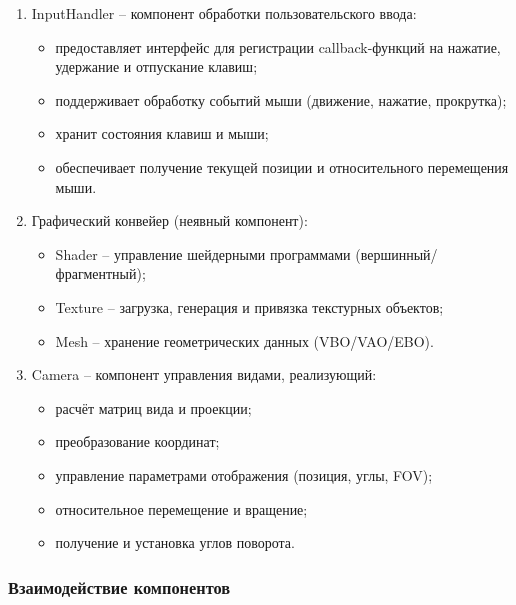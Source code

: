 \begin{enumerate}
    \item InputHandler -- компонент обработки пользовательского ввода:

    \begin{itemize}[itemindent=\parindent,leftmargin=\parindent]
        \item предоставляет интерфейс для регистрации callback-функций на нажатие, удержание и отпускание клавиш;
        \item поддерживает обработку событий мыши (движение, нажатие, прокрутка);
        \item хранит состояния клавиш и мыши;
        \item обеспечивает получение текущей позиции и относительного перемещения мыши.
    \end{itemize}

    \item Графический конвейер (неявный компонент):

    \begin{itemize}[itemindent=\parindent,leftmargin=\parindent]
        \item Shader -- управление шейдерными программами (вершинный/фрагментный);
        \item Texture -- загрузка, генерация и привязка текстурных объектов;
        \item Mesh -- хранение геометрических данных (VBO/VAO/EBO).
    \end{itemize}

    \item Camera -- компонент управления видами, реализующий:

    \begin{itemize}[itemindent=\parindent,leftmargin=\parindent]
        \item расчёт матриц вида и проекции;
        \item преобразование координат;
        \item управление параметрами отображения (позиция, углы, FOV);
        \item относительное перемещение и вращение;
        \item получение и установка углов поворота.
    \end{itemize}
\end{enumerate}

\subsubsection{Взаимодействие компонентов}

